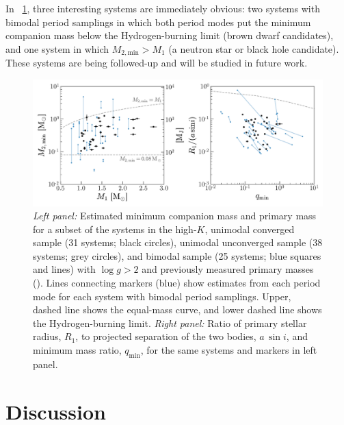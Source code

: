 \documentclass[modern, letterpaper]{aastex62}
\begin{document}
In \figurename~\ref{fig:mass}, three interesting systems are immediately
obvious: two systems with bimodal period samplings in which both period modes
put the minimum companion mass below the Hydrogen-burning limit (brown dwarf
candidates), and one system in which $M_{2, \textrm{min}} > M_1$ (a neutron star
or black hole candidate).
These systems are being followed-up and will be studied in future work.

\begin{figure}[h]
\begin{center}
\includegraphics[width=\textwidth]{mass}
\end{center}
\caption{%
\textit{Left panel:} Estimated minimum companion mass and primary mass for a
subset of the systems in the high-$K$, unimodal converged sample (31 systems;
black circles), unimodal unconverged sample (38 systems; grey circles), and
bimodal sample (25 systems; blue squares and lines) with $\log g > 2$ and
previously measured primary masses (\citealt{Ness:2015}).
Lines connecting markers (blue) show estimates from each period mode for each
system with bimodal period samplings.
Upper, dashed line shows the equal-mass curve, and lower dashed line shows the
Hydrogen-burning limit.
\textit{Right panel:} Ratio of primary stellar radius, $R_1$, to projected
separation of the two bodies, $a\,\sin i$, and minimum mass ratio,
$q_{\textrm{min}}$, for the same systems and markers in left panel.
\label{fig:mass}
}
\end{figure}


%


\section{Discussion}
\end{document}
